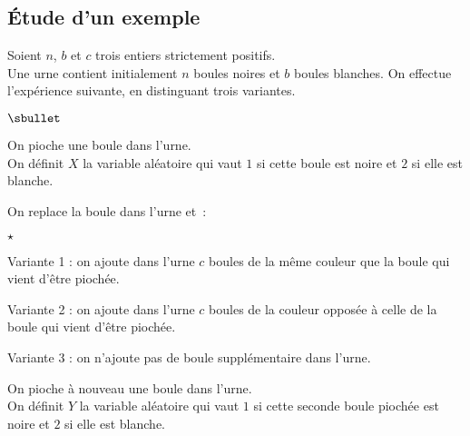 \documentclass[11pt]{article}%
\begin{document}
\newpage


\subsection*{\'Etude d'un exemple}

\noindent
Soient $n$, $b$ et $c$ trois entiers strictement positifs.\\
Une urne contient initialement $n$ boules noires et $b$ boules
blanches. On effectue l'expérience suivante, en distinguant trois
variantes.

\begin{noliste}{$\sbullet$}
\item On pioche une boule dans l'urne. \\
  On définit $X$ la variable aléatoire qui vaut $1$ si cette boule est
  noire et $2$ si elle est blanche.
  
\item On replace la boule dans l'urne et~:
  \begin{noliste}{$\star$}
  \item Variante 1 : on ajoute dans l'urne $c$ boules de la même 
    couleur que la boule qui vient d'être piochée.
    
  \item Variante 2 : on ajoute dans l'urne $c$ boules de la 
    couleur opposée à celle de la boule qui vient d'être piochée.
    
  \item Variante 3 : on n'ajoute pas de boule supplémentaire 
    dans l'urne.
  \end{noliste}
  
\item On pioche à nouveau une boule dans l'urne.\\
  On définit $Y$ la variable aléatoire qui vaut $1$ si cette seconde 
  boule piochée est noire et $2$ si elle est blanche.
\end{noliste}
\end{document}
